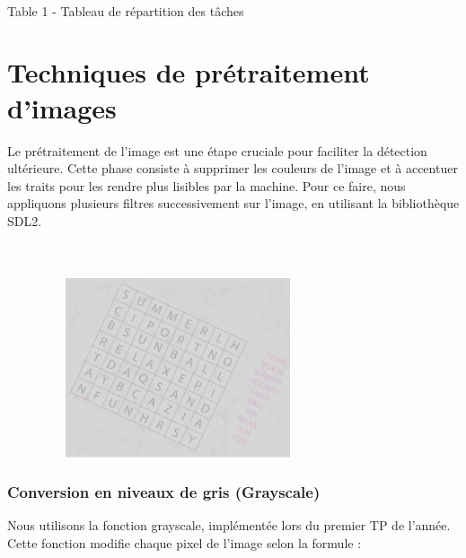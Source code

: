 \begin{center}
    \noindent \\Table 1 - Tableau de répartition des tâches
\end{center}

\chapter{Techniques de prétraitement d'images} 

Le prétraitement de l'image est une étape cruciale pour faciliter la détection ultérieure. Cette phase consiste à supprimer les couleurs de l'image et à accentuer les traits pour les rendre plus lisibles par la machine. Pour ce faire, nous appliquons plusieurs filtres successivement sur l'image, en utilisant la bibliothèque SDL2.\\

\\

\\

\begin{figure}[hbt]
	\centering
	\includegraphics[width=300px,height=200px]{obrazky-figures/1.png}
\end{figure}

\subsection{Conversion en niveaux de gris (Grayscale)}

Nous utilisons la fonction grayscale, implémentée lors du premier TP de l'année. Cette fonction modifie chaque pixel de l'image selon la formule :

